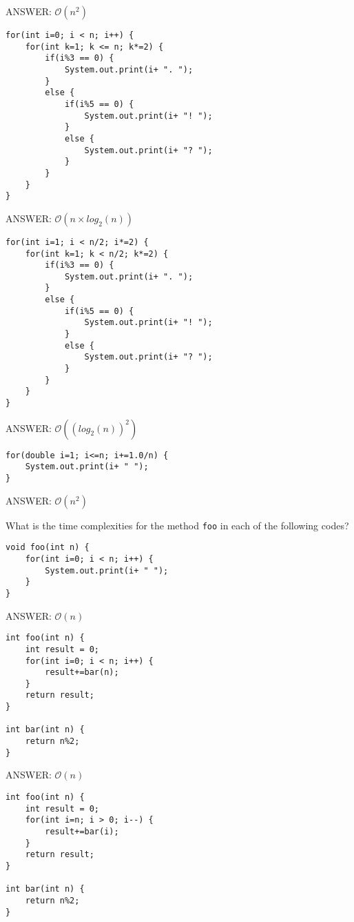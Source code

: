 \begin{questions}
\ifprintanswers
ANSWER: $\mathcal{O}(n^2)$
\else
\fi

\begin{lstlisting}
for(int i=0; i < n; i++) {
	for(int k=1; k <= n; k*=2) {
		if(i%3 == 0) {
			System.out.print(i+ ". ");
		}
		else {
			if(i%5 == 0) {
				System.out.print(i+ "! ");
			}
			else {
				System.out.print(i+ "? ");
			}
		}
	}
}
\end{lstlisting}

\ifprintanswers
ANSWER: $\mathcal{O}(n \times log_2(n))$
\else
\fi

\begin{lstlisting}
for(int i=1; i < n/2; i*=2) {
	for(int k=1; k < n/2; k*=2) {
		if(i%3 == 0) {
			System.out.print(i+ ". ");
		}
		else {
			if(i%5 == 0) {
				System.out.print(i+ "! ");
			}
			else {
				System.out.print(i+ "? ");
			}
		}
	}
}
\end{lstlisting}

\ifprintanswers
ANSWER: $\mathcal{O}((log_2(n))^2)$
\else
\fi

\begin{lstlisting}
for(double i=1; i<=n; i+=1.0/n) {
	System.out.print(i+ " ");
}
\end{lstlisting}


\ifprintanswers
ANSWER: $\mathcal{O}(n^2)$
\else
\fi


\question What is the time complexities for the method \texttt{foo} in each of the following codes?

\begin{lstlisting}
void foo(int n) {
	for(int i=0; i < n; i++) {
		System.out.print(i+ " ");
	}
}
\end{lstlisting}

\ifprintanswers
ANSWER: $\mathcal{O}(n)$
\else
\fi


\begin{lstlisting}
int foo(int n) {
	int result = 0;
	for(int i=0; i < n; i++) {
		result+=bar(n);
	}
	return result;
}

int bar(int n) {
	return n%2;
}
\end{lstlisting}

\ifprintanswers
ANSWER: $\mathcal{O}(n)$
\else
\fi

\begin{lstlisting}
int foo(int n) {
	int result = 0;
	for(int i=n; i > 0; i--) {
		result+=bar(i);
	}
	return result;
}

int bar(int n) {
	return n%2;
}
\end{lstlisting}


\end{questions}

